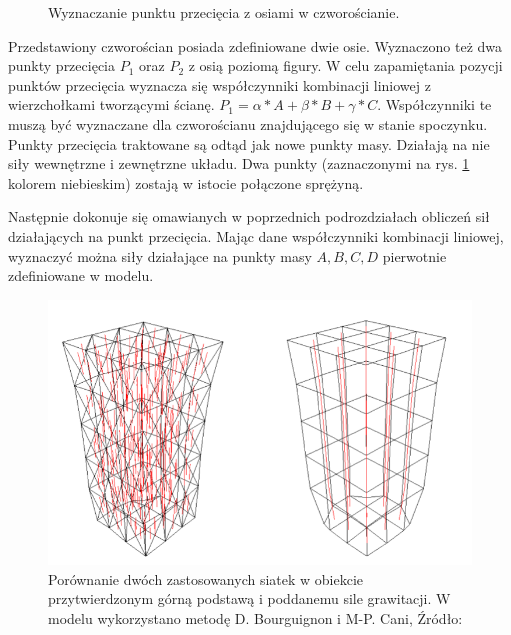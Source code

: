 \begin{figure}[ht]
\centering

\caption{Wyznaczanie punktu przecięcia z osiami w czworościanie.}
\label{anizotropia-czworoscian}
\end{figure}

Przedstawiony czworościan posiada zdefiniowane dwie osie. Wyznaczono też dwa
punkty przecięcia $P_1$ oraz $P_2$ z osią poziomą figury. W celu zapamiętania
pozycji punktów przecięcia wyznacza się współczynniki kombinacji liniowej z
wierzchołkami tworzącymi ścianę. $P_1 = \alpha * A + \beta *B + \gamma *C$.
Współczynniki te muszą być wyznaczane dla czworościanu znajdującego się w stanie
spoczynku. Punkty przecięcia traktowane są odtąd jak nowe punkty masy. Działają
na nie siły wewnętrzne i zewnętrzne układu. Dwa punkty (zaznaczonymi na rys.
		\ref{anizotropia-czworoscian} kolorem niebieskim) zostają w istocie
połączone sprężyną.

Następnie dokonuje się omawianych w poprzednich podrozdziałach obliczeń sił
działających na punkt przecięcia. Mając dane współczynniki kombinacji liniowej,
	wyznaczyć można siły działające na punkty masy $A,B,C, D$ pierwotnie zdefiniowane w modelu. 

\begin{figure}[ht]
\centering
\includegraphics[scale=0.5]{images/fixed_anisotropy.png}
\caption{Porównanie dwóch zastosowanych siatek w obiekcie przytwierdzonym górną podstawą i poddanemu sile grawitacji. W modelu wykorzystano metodę D. Bourguignon i M-P. Cani, Źródło: \cite{ca}}
\label{anizotropia-czworoscian-fix}
\end{figure}

